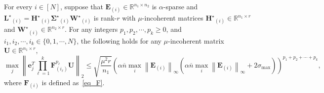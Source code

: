 \documentclass[twoside,11pt]{article}
\newcommand{\norm}[1]{\left\lVert#1\right\rVert}
\newcommand{\matE}{\mathbf{E}}
\newcommand{\matF}{\mathbf{F}}
\newcommand{\matHst}{{\mathbf{H}^\star}}
\newcommand{\matLst}{{\mathbf{L}^\star}}
\newcommand{\matSigmast}{{\mathbf{\Sigma}^\star}}
\newcommand{\matU}{\mathbf{U}}
\newcommand{\matUst}{{\mathbf{U}^\star}}
\newcommand{\matWst}{{\mathbf{W}^\star}}
\newcommand{\vece}{\mathbf{e}}
\newcommand{\gop}{\sigma_{\max}}
\newcommand{\bn}{{\overline{n}}}
\newcommand{\abnb}{\alpha \bn\max_{i}\norm{\matE_{(i)}}_{\infty}}
\newcommand{\murnone}{\frac{\mu^2 r}{n_1}}
\begin{document}
\begin{lemma}
\label{lm:efuinfnorm}
For every $i\in [N]$, suppose that 
$\matE_{(i)}\in \mathbb{R}^{n_1\times n_2}$ is $\alpha$-sparse and $\matLst_{(i)}=\matHst_{(i)}\matSigmast_{(i)}\matWst_{(i)}$ is rank-$r$ with $\mu$-incoherent matrices $\matHst_{(i)}\in \mathbb{R}^{n_1\times r}$ and $\matWst_{(i)}\in \mathbb{R}^{n_2\times r}$. For any integers $p_1,p_2,\cdots,p_k\ge 0$, and $i_1,i_2,\cdots,i_k\in\{0,1,\cdots,N\}$, the following holds for any $\mu$-incoherent matrix $\matU\in \mathbb{R}^{n_1\times r}$,
\begin{equation}
\max_j\norm{\vece_j^T\prod_{\ell=1}^k\matF_{(i_{\ell})}^{p_{\ell}}\matU}_2\le \sqrt{\murnone}\left(\abnb(\abnb+2\gop)\right)^{p_1+p_2+\cdots+p_k},
\end{equation}
where $\matF_{(i)}$ is defined as~\eqref{eq_F}.
\end{lemma}
\end{document}
